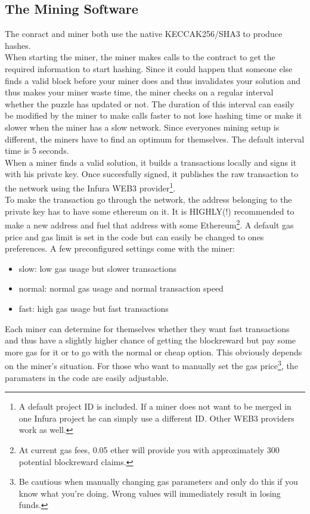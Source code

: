 \documentclass{article}
\begin{document}
\subsection{The Mining Software}
The conract and miner both use the native KECCAK256/SHA3 to produce hashes.\\
When starting the miner, the miner makes calls to the contract to get the required information to start hashing. Since it could happen that someone else finds a valid block before your miner does and thus invalidates your solution and thus makes your miner waste time, the miner checks on a regular interval whether the puzzle has updated or not. The duration of this interval can easily be modified by the miner to make calls faster to not lose hashing time or make it slower when the miner has a slow network. Since everyones mining setup is different, the miners have to find an optimum for themselves. The default interval time is 5 seconds.\\
When a miner finds a valid solution, it builds a transactions locally and signs it with his private key. Once succesfully signed, it publishes the raw transaction to the network using the Infura WEB3 provider\footnote{A default project ID is included. If a miner does not want to be merged in one Infura project he can simply use a different ID. Other WEB3 providers work as well.}. \\
To make the transaction go through the network, the address belonging to the private key has to have some ethereum on it. It is HIGHLY(!) recommended to make a new address and fuel that address with some Ethereum\footnote{At current gas fees, 0.05 ether will provide you with approximately 300 potential blockreward claims.}.
A default gas price and gas limit is set in the code but can easily be changed to ones preferences. A few preconfigured settings come with the miner:
\begin{itemize}
\item slow: low gas usage but slower transactions
\item normal: normal gas usage and normal transaction speed
\item fast: high gas usage but fast transactions
\end{itemize}
Each miner can determine for themselves whether they want fast transactions and thus have a slightly higher chance of getting the blockreward but pay some more gas for it or to go with the normal or cheap option. This obviously depends on the miner's situation. For those who want to manually set the gas price\footnote{Be cautious when manually changing gas parameters and only do this if you know what you're doing. Wrong values will immediately result in losing funds.}, the paramaters in the code are easily adjustable.
\pagebreak
\end{document}
